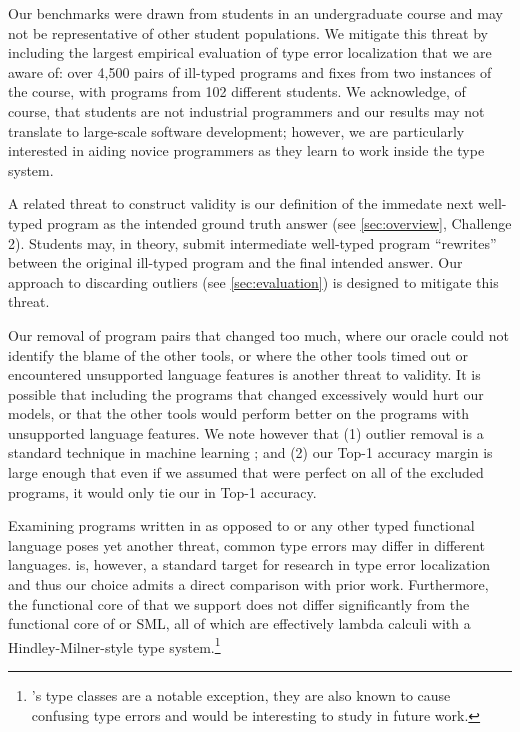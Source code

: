 Our benchmarks were drawn from students in an undergraduate course and
may not be representative of other student populations.
%
We mitigate this threat by including the largest empirical evaluation of
type error localization that we are aware of: over 4,500 pairs of
ill-typed programs and fixes from two instances of the course, with
programs from 102 different students.
%
We acknowledge, of course, that students are not industrial programmers
and our results may not translate to large-scale software development;
however, we are particularly interested in aiding novice programmers
as they learn to work inside the type system.

A related threat to construct validity is our definition of the immedate
next well-typed program as the intended ground truth answer (see
\autoref{sec:overview}, Challenge 2). Students may, in theory, submit
intermediate well-typed program ``rewrites'' between the original ill-typed
program and the final intended answer. Our approach to discarding outliers
(see \autoref{sec:evaluation}) is designed to mitigate this threat. 

Our removal of program pairs that changed too much, where our oracle
could not identify the blame of the other tools, or where the other
tools timed out or encountered unsupported language features is another
threat to validity.
%
It is possible that including the programs that changed excessively
would hurt our models, or that the other tools would perform
better on the programs with unsupported language features.
%
We note however that
%
(1) outlier removal is a standard technique in machine learning
; and
%
(2) our Top-1 accuracy margin is large enough that even if we assumed
that \sherrloc were perfect on all of the excluded programs, it would
only tie our \hiddenFH in Top-1 accuracy.
%

Examining programs written in \ocaml as opposed to \haskell or any other
typed functional language poses yet another threat, common type errors
may differ in different languages.
%
\ocaml is, however, a standard target for research in type error
localization and thus our choice admits a direct comparison with prior
work.
%
Furthermore, the functional core of \ocaml that we support does not
differ significantly from the functional core of \haskell or SML, all of
which are effectively lambda calculi with a Hindley-Milner-style type
system.\footnote{\haskell's type classes are a notable exception, they
  are also known to cause confusing type errors and would be interesting
  to study in future work.}

